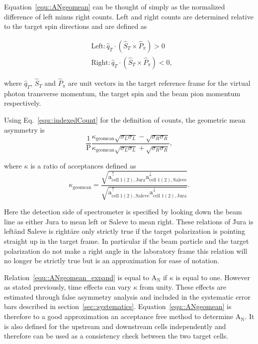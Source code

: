 Equation~\ref{equ::ANgeomean} can be thought of simply as the normalized
difference of left minus right counts.  Left and right counts are determined
relative to the target spin directions and are defined as

\begin{equation}
  \label{equ::Defleftright}
  \begin{aligned}
    &\text{Left}: \hat{q}_T \cdot (\hat{S}_T \times \hat{P}_{\pi}) > 0 \\
    &\text{Right}: \hat{q}_T \cdot (\hat{S}_T \times \hat{P}_{\pi}) < 0, 
  \end{aligned}
\end{equation}

\noindent
where $\hat{q}_T$, $\hat{S}_T$ and $\hat{P}_{\pi}$ are unit vectors in the
target reference frame for the virtual photon transverse momentum, the target
spin and the beam pion momentum respectively.

Using Eq.~\ref{equ::indexedCount} for the definition of counts, the geometric
mean asymmetry is
\begin{equation}
  \label{equ::ANgeomean_expand}
  \frac{1}{\mathrm{P}}\frac{\kappa_{\mathrm{geomean}}
    \sqrt{\sigma_{L}\sigma_{L}} -
    \sqrt{\sigma_{R}\sigma_{R}}}{\kappa_{\mathrm{geomean}}
    \sqrt{\sigma_{L}\sigma_{L}} + \sqrt{\sigma_{R}\sigma_{R}}},
\end{equation}

\noindent
where $\kappa$ is a ratio of acceptances defined as
\begin{equation}
  \kappa_{\mathrm{geomean}} =
  \frac{\sqrt{\mathrm{a}^{\uparrow}_{\mathrm{cell\;1(2),Jura}}
      \mathrm{a}^{\downarrow}_{\mathrm{cell\;1(2),Saleve}}}}
       {\sqrt{\mathrm{a}^{\uparrow}_{\mathrm{cell\;1(2),Saleve}}
           \mathrm{a}^{\downarrow}_{\mathrm{cell\;1(2),Jura}}}}.
       \label{equ::accGeoMean}
\end{equation}

\noindent
Here the detection side of spectrometer is specified by looking down the beam
line as either Jura to mean left or Saleve to mean right.  These relations of
\"Jura is left\" and \"Saleve is right\" are only strictly true if the target
polarization is pointing straight up in the target frame.  In particular if the
beam particle and the target polarization do not make a right angle in the
laboratory frame this relation will no longer be strictly true but is an
approximation for ease of notation.

Relation~\ref{equ::ANgeomean_expand} is equal to A$_{\mathrm{N}}$ if $\kappa$ is
equal to one.  However as stated previously, time effects can vary $\kappa$ from
unity. These effects are estimated through false asymmetry analysis and included
in the systematic error bars described in section~\ref{sec::systematics}.
Equation~\ref{equ::ANgeomean} is therefore to a good approximation an acceptance
free method to determine A$_{\mathrm{N}}$.  It is also defined for the upstream
and downstream cells independently and therefore can be used as a consistency
check between the two target cells.

